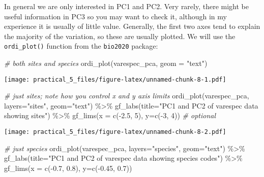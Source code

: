 \documentclass[
]{article}
\newenvironment{Shaded}{\begin{snugshade}}{\end{snugshade}}
\newcommand{\AttributeTok}[1]{\textcolor[rgb]{0.77,0.63,0.00}{#1}}
\newcommand{\CommentTok}[1]{\textcolor[rgb]{0.56,0.35,0.01}{\textit{#1}}}
\newcommand{\DecValTok}[1]{\textcolor[rgb]{0.00,0.00,0.81}{#1}}
\newcommand{\FloatTok}[1]{\textcolor[rgb]{0.00,0.00,0.81}{#1}}
\newcommand{\FunctionTok}[1]{\textcolor[rgb]{0.00,0.00,0.00}{#1}}
\newcommand{\NormalTok}[1]{#1}
\newcommand{\SpecialCharTok}[1]{\textcolor[rgb]{0.00,0.00,0.00}{#1}}
\newcommand{\StringTok}[1]{\textcolor[rgb]{0.31,0.60,0.02}{#1}}
\begin{document}
In general we are only interested in PC1 and PC2. Very rarely, there
might be useful information in PC3 so you may want to check it, although
in my experience it is usually of little value. Generally, the first two
axes tend to explain the majority of the variation, so these are usually
plotted. We will use the \texttt{ordi\_plot()} function from the
\texttt{bio2020} package:

\begin{Shaded}
\begin{Highlighting}[]
\CommentTok{\# both sites and species}
\FunctionTok{ordi\_plot}\NormalTok{(varespec\_pca, }\AttributeTok{geom =} \StringTok{"text"}\NormalTok{)}
\end{Highlighting}
\end{Shaded}

\texttt{[image: practical\_5\_files/figure-latex/unnamed-chunk-8-1.pdf]}

\begin{Shaded}
\begin{Highlighting}[]
\CommentTok{\# just sites; note how you control x and y axis limits}
\FunctionTok{ordi\_plot}\NormalTok{(varespec\_pca, }\AttributeTok{layers=}\StringTok{"sites"}\NormalTok{, }\AttributeTok{geom=}\StringTok{"text"}\NormalTok{) }\SpecialCharTok{\%\textgreater{}\%} 
  \FunctionTok{gf\_labs}\NormalTok{(}\AttributeTok{title=}\StringTok{"PC1 and PC2 of varespec data showing sites"}\NormalTok{) }\SpecialCharTok{\%\textgreater{}\%} 
  \FunctionTok{gf\_lims}\NormalTok{(}\AttributeTok{x =} \FunctionTok{c}\NormalTok{(}\SpecialCharTok{{-}}\FloatTok{2.5}\NormalTok{, }\DecValTok{5}\NormalTok{), }\AttributeTok{y=}\FunctionTok{c}\NormalTok{(}\SpecialCharTok{{-}}\DecValTok{3}\NormalTok{, }\DecValTok{4}\NormalTok{)) }\CommentTok{\# optional}
\end{Highlighting}
\end{Shaded}

\texttt{[image: practical\_5\_files/figure-latex/unnamed-chunk-8-2.pdf]}

\begin{Shaded}
\begin{Highlighting}[]
\CommentTok{\# just species}
\FunctionTok{ordi\_plot}\NormalTok{(varespec\_pca, }\AttributeTok{layers=}\StringTok{"species"}\NormalTok{, }\AttributeTok{geom=}\StringTok{"text"}\NormalTok{) }\SpecialCharTok{\%\textgreater{}\%} 
  \FunctionTok{gf\_labs}\NormalTok{(}\AttributeTok{title=}\StringTok{"PC1 and PC2 of varespec data showing species codes"}\NormalTok{) }\SpecialCharTok{\%\textgreater{}\%} 
  \FunctionTok{gf\_lims}\NormalTok{(}\AttributeTok{x =} \FunctionTok{c}\NormalTok{(}\SpecialCharTok{{-}}\FloatTok{0.7}\NormalTok{, }\FloatTok{0.8}\NormalTok{), }\AttributeTok{y=}\FunctionTok{c}\NormalTok{(}\SpecialCharTok{{-}}\FloatTok{0.45}\NormalTok{, }\FloatTok{0.7}\NormalTok{))}
\end{Highlighting}
\end{Shaded}
\end{document}
